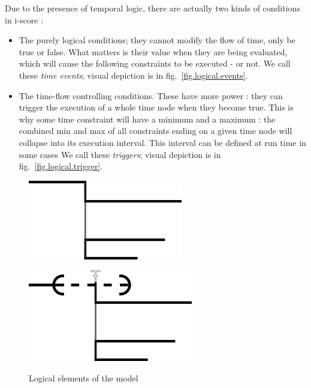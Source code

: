 \documentclass{sigchi}
\begin{document}
Due to the presence of temporal logic, there are actually two kinds of conditions in i-score : 
\begin{itemize}
	\item The purely logical conditions; they cannot modify the flow of time, only be true or false. What matters is their value when they are being evaluated, which will cause the following constraints to be executed - or not. We call these \textit{time events}; visual depiction is in fig.~\ref{fig.logical.events}.
	\item The time-flow controlling conditions. These have more power : they can trigger the execution of a whole time node when they become true. This is why some time constraint will have a minimum and a maximum : the combined min and max of all constraints ending on a given time node will collapse into its execution interval. This interval can be defined at run time in some cases %
	We call these \textit{triggers}; visual depiction is in fig.~\ref{fig.logical.trigger}.
\end{itemize}

\begin{figure}
	\centering
	\begin{minipage}[b]{.5\linewidth}
		\centering
		\includegraphics[scale=0.5]{images/events.png}
		\label{fig.logical.events}
	\end{minipage}\begin{minipage}[b]{.5\linewidth}
	\centering
	\includegraphics[scale=0.5]{images/trigger.png}
	\label{fig.logical.trigger}
    \end{minipage}	

\caption{Logical elements of the model}
\label{fig.logical}
\end{figure}	
\end{document}
